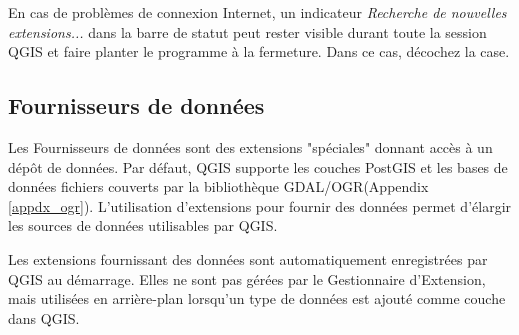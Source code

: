 En cas de probl\`emes de connexion Internet, un indicateur \textit{Recherche de nouvelles extensions...} dans la barre de statut peut rester visible durant toute la session QGIS et faire planter le programme \`a la fermeture. Dans ce cas, d\'ecochez la case.

%
%

\subsection{Fournisseurs de donn\'ees}

Les Fournisseurs de donn\'ees sont des extensions "sp\'eciales" donnant acc\`es \`a un d\'ep\^ot de donn\'ees.
Par d\'efaut, QGIS supporte les couches PostGIS et les bases de donn\'ees fichiers couverts par la biblioth\`eque GDAL/OGR(Appendix \ref{appdx_ogr}).
L'utilisation d'extensions pour fournir des donn\'ees permet d'\'elargir les sources de donn\'ees utilisables par QGIS.

Les extensions fournissant des donn\'ees sont automatiquement enregistr\'ees par QGIS au d\'emarrage.
Elles ne sont pas g\'er\'ees par le Gestionnaire d'Extension, mais utilis\'ees en arri\`ere-plan lorsqu'un type de donn\'ees est ajout\'e comme couche dans QGIS.
